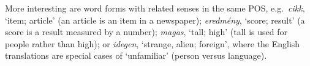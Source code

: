 \documentclass[11pt]{article}
\newcommand{\paprika}{
\begin{figure}
\texttt{[image: paprika]}
\end{figure}
}
\begin{document}


More interesting are word forms with related senses in the same POS,
e.g.~\emph{cikk}, `item; article' (an article is an item in a newspaper);
\emph{eredmény}, `score; result' (a score is a result measured by a number);
\emph{magas}, `tall; high' (tall is used for people rather than high); or
\emph{idegen}, `strange, alien; foreign', where the English translations are
special cases of `unfamiliar' (person versus language).

\end{document}
